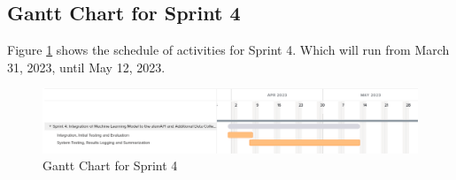 \subsection{Gantt Chart for Sprint 4}
\label{subsec:gantt_chart_sprint4}
Figure \ref{fig:gantt_chart_sprint4} shows the schedule of activities for Sprint 4. 
Which will run from March 31, 2023, until May 12, 2023.
\begin{figure}[ht]
    \centering
    \includegraphics[width=1\textwidth]{./assets/Gantt_Chart_Sprint4.png}
    \caption{Gantt Chart for Sprint 4}
    \label{fig:gantt_chart_sprint4}
\end{figure}
\FloatBarrier